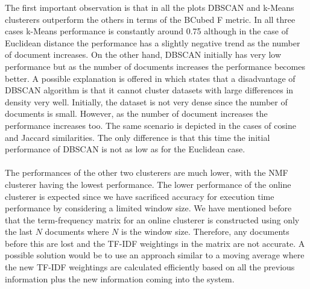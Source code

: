 \noindent The first important observation is that in all the plots DBSCAN and k-Means clusterers outperform the others in terms of the BCubed F metric. In all three cases k-Means performance is constantly around 0.75 although in the case of Euclidean distance the performance has a slightly negative trend as the number of document increases. On the other hand, DBSCAN initially has very low performance but as the number of documents increases the performance becomes better. A possible explanation is offered in \citep{Pratap2011} which states that a disadvantage of DBSCAN algorithm is that it cannot cluster datasets with large differences in density very well. Initially, the dataset is not very dense since the number of documents is small. However, as the number of document increases the performance increases too. The same scenario is depicted in the cases of cosine and Jaccard similarities. The only difference is that this time the initial performance of DBSCAN is not as low as for the Euclidean case.\\\\
The performances of the other two clusterers are much lower, with the NMF clusterer having the lowest performance. The lower performance of the online clusterer is expected since we have sacrificed accuracy for execution time performance by considering a limited window size. We have mentioned before that the term-frequency matrix for an online clusterer is constructed using only the last $N$ documents where $N$ is the window size. Therefore, any documents before this are lost and the TF-IDF weightings in the matrix are not accurate. A possible solution would be to use an approach similar to a moving average where the new TF-IDF weightings are calculated efficiently based on all the previous information plus the new information coming into the system.   

